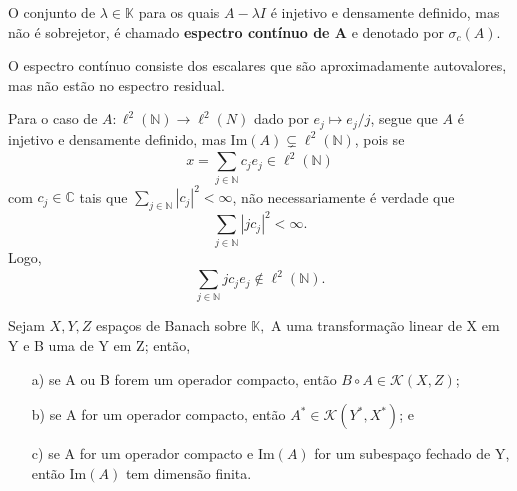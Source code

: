 \documentclass[../functional_analysis.tex]{subfiles}
\begin{document}
\begin{tcolorbox}[
		skin=enhanced,
		title=Lembrete!,
		after title={\hfill Espectro Contínuo},
		fonttitle=\bfseries,
		sharp corners=downhill,
		colframe=black,
		colbacktitle=yellow!75!white,
		colback=yellow!30,
		colbacklower=black,
		coltitle=black,
		drop large lifted shadow
	]
	O conjunto de \(\lambda\in \mathbb{K}\) para os quais \(A-\lambda I\) é injetivo e densamente definido, mas não é sobrejetor, é chamado \textbf{espectro contínuo de A}
	e denotado por \(\sigma_{c}(A)\).

	O espectro contínuo consiste dos escalares que são aproximadamente autovalores, mas não estão no espectro residual.

	Para o caso de \(A:\ell^{2}(\mathbb{N})\rightarrow \ell^{2}(N)\) dado por \(e_{j}\mapsto e_{j}/j\), segue que \(A\) é injetivo e densamente definido, mas \(\mathrm{Im}(A)\subsetneq \ell^{2}(\mathbb{N})\), pois se
	\[
		x=\sum\limits_{j\in \mathbb{N}}^{}c_{j}e_{j}\in \ell^{2}(\mathbb{N})
	\]
	com \(c_{j}\in \mathbb{C}\) tais que \(\sum\limits_{j\in \mathbb{N}}^{}| c_{j} |^{2}<\infty\), não necessariamente é verdade que
	\[
		\sum\limits_{j\in \mathbb{N}}^{}| jc_{j} |^{2}<\infty.
	\]
	Logo,
	\[
		\sum\limits_{j\in \mathbb{N}}^{}jc_{j}e_{j}\not\in \ell^{2}(\mathbb{N}).
	\]
\end{tcolorbox}
\begin{theorem*}
	Sejam \(X, Y, Z \) espaços de Banach sobre \(\mathbb{K},\) A uma transformação linear de X em Y e B uma de Y em Z; então,
	\begin{itemize}
		\item[a)] se A ou B forem um operador compacto, então \(B\circ A\in \mathcal{K}(X, Z)\);
		\item[b)] se A for um operador compacto, então \(A^{*}\in \mathcal{K}(Y^{*}, X^{*})\); e
		\item[c)] se A for um operador compacto e \(\mathrm{Im}(A)\) for um subespaço fechado de Y, então \(\mathrm{Im}(A)\) tem dimensão finita.
	\end{itemize}
\end{theorem*}
\end{document}

